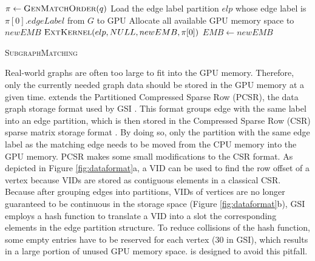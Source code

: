 \begin{algorithm}[t!]
  $\pi \leftarrow \textsc{GenMatchOrder}(q)$\;
Load the edge label partition $elp$ whose edge label is $\pi[0].edgeLabel$ from $G$ to GPU\; Allocate all available GPU memory space to
$newEMB$\; $\textsc{ExtKernel}(elp,NULL,newEMB,\pi[0])$\; $EMB \leftarrow newEMB$\;  \caption{\textsc{SubgraphMatching}} \label{algo:submatch}
\end{algorithm}


%
Real-world graphs are often too large to fit into the GPU memory. Therefore, only the currently needed graph data should be stored in the
GPU memory at a given time. \SystemName extends the Partitioned Compressed Sparse Row (PCSR), the data graph storage format used by GSI
\cite{zeng2020gsi}. This format groups edge with the same label into an edge partition, which is then stored in the Compressed Sparse Row
(CSR) sparse matrix storage format \FIXME{\cite{}}. By doing so, only the partition with the same edge label as the matching edge needs to
be moved from the CPU memory into the GPU memory. PCSR makes some small modifications to the CSR format. As depicted in Figure
\ref{fig:dataformat}a, a VID can be used to find the row offset of a vertex because VIDs are stored as contiguous elements in a classical
CSR. Because after grouping edges into partitions, VIDs of vertices are no longer guaranteed to be continuous in the storage space (Figure
\ref{fig:dataformat}b), GSI employs a hash function to translate a VID into a slot the corresponding elements in the edge partition
structure. To reduce collisions of the hash function, some empty entries have to be reserved for each vertex (30 in GSI), which results in
a large portion of unused GPU memory space. \SystemName is designed to avoid this pitfall.


